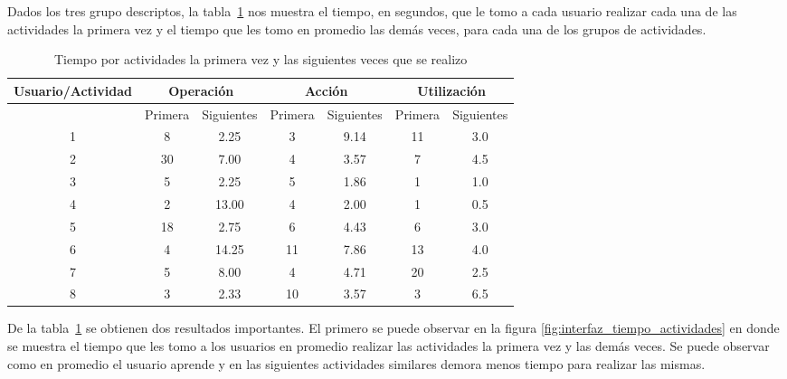 Dados los tres grupo descriptos, la tabla~\ref{tab:interfaz_tiempo_actividades} nos muestra el tiempo, en segundos, que le tomo a cada usuario realizar cada una de las actividades la primera vez y el tiempo que les tomo en promedio las demás veces, para cada una de los grupos de actividades.

\begin{table}[!hbt]
\centering
\begin{tabular}{|c|c|c|c|c|c|c|}
\hline
\rowcolor{gris} \textbf{Usuario/Actividad} & \multicolumn{2}{|c|}{\textbf{Operación}} & \multicolumn{2}{|c|}{\textbf{Acción}} & \multicolumn{2}{|c|}{\textbf{Utilización}}\\
\hline
\rowcolor{gris}  & Primera & Siguientes & Primera & Siguientes & Primera & Siguientes \\
\hline 1 & 8  & 2.25  & 3  & 9.14 & 11 & 3.0 \\
\hline 2 & 30 & 7.00  & 4  & 3.57 & 7  & 4.5 \\
\hline 3 & 5  & 2.25  & 5  & 1.86 & 1  & 1.0 \\
\hline 4 & 2  & 13.00 & 4  & 2.00 & 1  & 0.5 \\
\hline 5 & 18 & 2.75  & 6  & 4.43 & 6  & 3.0 \\
\hline 6 & 4  & 14.25 & 11 & 7.86 & 13 & 4.0 \\
\hline 7 & 5  & 8.00  & 4  & 4.71 & 20 & 2.5 \\
\hline 8 & 3  & 2.33  & 10 & 3.57 & 3  & 6.5 \\
\hline
\end{tabular}
\caption{Tiempo por actividades la primera vez y las siguientes veces que se realizo}
\label{tab:interfaz_tiempo_actividades}
\end{table}


De la tabla~\ref{tab:interfaz_tiempo_actividades} se obtienen dos resultados importantes. El primero se puede observar en la figura \ref{fig:interfaz_tiempo_actividades} en donde se muestra el tiempo que les tomo a los usuarios en promedio realizar las actividades la primera vez y las demás veces. Se puede observar como en promedio el usuario aprende y en las siguientes actividades similares demora menos tiempo para realizar las mismas.

